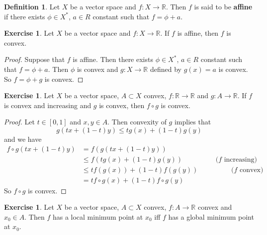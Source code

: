 \documentclass[12pt]{amsart}
\theoremstyle{definition}
\newtheorem{defn}[definition]{Definition}
\newtheorem{ex}[definition]{Exercise}
\newcommand{\R}{\mathbb{R}}
\newcommand{\lex}[1]{\label{ex:#1}}
\newcommand{\ld}[1]{\label{defn:#1}}
\begin{document}
	
	\begin{defn} \ld{}
	Let $X$ be a vector space and $f: X \rightarrow \R$. Then $f$ is said to be \textbf{affine} if there exists $\phi \in X^*$, $a \in R$ constant such that $f = \phi + a$.\\
	\end{defn}
	
	\begin{ex} \lex{}
	Let $X$ be a vector space and $f: X \rightarrow \R$. If $f$ is affine, then $f$ is convex.
	\end{ex}
	
	\begin{proof}
	Suppose that $f$ is affine. Then there exists $\phi \in X^*$, $a \in R$ constant such that $f = \phi + a$. Then $\phi$ is convex and $g: X \rightarrow \R$ defined by $g(x) = a$ is convex. So $f = \phi + g$ is convex.
	\end{proof}
	
	\begin{ex} \lex{}
	Let $X$ be a vector space, $A \subset X$ convex, $f:\R \rightarrow \R$ and $g: A \rightarrow \R$. If $f$ is convex and increasing and $g$ is convex, then $f \circ g$ is convex.
	\end{ex}	
	
	\begin{proof}
	Let $t \in [0,1]$ and $x, y \in A$. Then convexity of $g$ implies that $$g(tx +(1-t)y) \leq tg(x) + (1-t)g(y)$$ and we have
	\begin{align*}
	f\circ g(tx +(1-t)y) 
	&= f(g(tx +(1-t)y)) \\
	& \leq f(tg(x) + (1-t)g(y)) \hspace{2cm} (f \text{ increasing)}\\
	& \leq tf(g(x)) + (1-t)f(g(y)) \hspace{2cm}  (f \text{ convex)}\\	
	&= tf \circ g(x) + (1-t)f \circ g(y)
\end{align*}	 
So $f \circ g$ is convex.
	\end{proof}
	
	\begin{ex} \lex{}
	Let $X$ be a vector space, $A \subset X$ convex, $f:A \rightarrow \R$ convex and $x_0 \in A$. Then $f$ has a local minimum point at $x_0$ iff $f$ has a global minimum point at $x_0$.
	\end{ex}	
	
\end{document}
